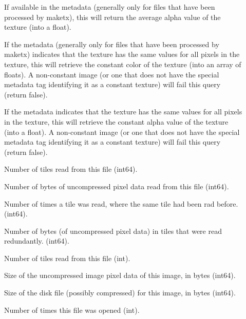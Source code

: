 \begin{description}
\item[\rm {}] If available in the metadata (generally only
for files that have been processed by {\cf maketx}), this will return the
average alpha value of the texture (into a float).

\item[\rm {}] If the metadata (generally only for files that
have been processed by {\cf maketx}) indicates that the texture has the same
values for all pixels in the texture, this will retrieve the constant color
of the texture (into an array of floats). A non-constant image (or one that
does not have the special metadata tag identifying it as a constant texture)
will fail this query (return false).

\item[\rm {}] If the metadata indicates that the texture has
the same values for all pixels in the texture, this will retrieve the
constant alpha value of the texture (into a float). A non-constant image (or
one that does not have the special metadata tag identifying it as a constant
texture) will fail this query (return false).

\item[\rm {}] Number of tiles read from this file ({\cf int64}).

\item[\rm {}] Number of bytes of uncompressed pixel data read
from this file ({\cf int64}).

\item[\rm {}] Number of times a tile was read, where
the same tile had been rad before. ({\cf int64}).

\item[\rm {}] Number of bytes (of uncompressed pixel
data) in tiles that were read redundantly. ({\cf int64}).

\item[\rm {}] Number of tiles read from this file ({\cf int}).

\item[\rm {}] Size of the uncompressed image pixel data
of this image, in bytes ({\cf int64}).

\item[\rm {}] Size of the disk file (possibly compressed)
for this image, in bytes ({\cf int64}).

\item[\rm {}] Number of times this file was opened ({\cf int}).


\end{description}
